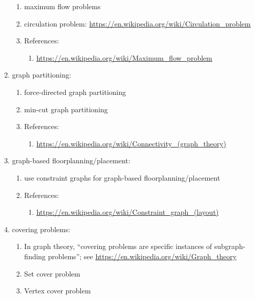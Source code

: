 \begin{enumerate}
\begin{enumerate}
	\item maximum flow problems
	\item circulation problem: \url{https://en.wikipedia.org/wiki/Circulation_problem}
	\item References: \vspace{-0.2cm}
		\begin{enumerate} \itemsep -2pt
		\item \url{https://en.wikipedia.org/wiki/Maximum_flow_problem}
		\end{enumerate}
	\end{enumerate}
\item graph partitioning: \vspace{-0.3cm}
	\begin{enumerate} \itemsep -2pt
	\item force-directed graph partitioning
	\item min-cut graph partitioning
	\item References: \vspace{-0.2cm}
		\begin{enumerate} \itemsep -2pt
		\item \url{https://en.wikipedia.org/wiki/Connectivity_(graph_theory)}
		\end{enumerate}
	\end{enumerate}
\item graph-based floorplanning/placement: \vspace{-0.3cm}
	\begin{enumerate} \itemsep -2pt
	\item use constraint graphs for graph-based floorplanning/placement
	\item References: \vspace{-0.2cm}
		\begin{enumerate} \itemsep -2pt
		\item \url{https://en.wikipedia.org/wiki/Constraint_graph_(layout)}
		\end{enumerate}
	\end{enumerate}
\item covering problems: \vspace{-0.3cm}
	\begin{enumerate} \itemsep -2pt
	\item In graph theory, ``covering problems are specific instances of subgraph-finding problems''; see \url{https://en.wikipedia.org/wiki/Graph_theory}
	\item Set cover problem
	\item Vertex cover problem

\end{enumerate}
\end{enumerate}
